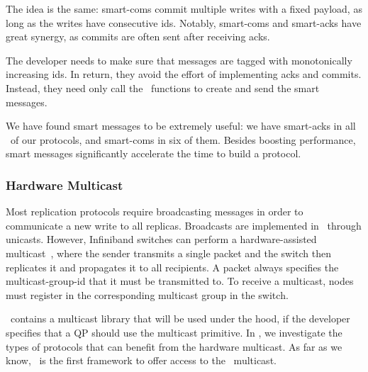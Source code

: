 The idea is the same: smart-coms commit multiple writes with a fixed payload, as long as the writes have consecutive ids. 
Notably, smart-coms and smart-acks have great synergy, as commits are often sent after receiving acks.

The developer needs to make sure that messages are tagged with monotonically increasing ids. In return, they avoid the effort of implementing acks and commits. Instead, they need only call the \odlib~functions to create and send the smart messages.

\custvspace
We have found smart messages to be extremely useful: we have smart-acks in all \pnum~of our protocols, and smart-coms in six of them. 
Besides boosting performance, smart messages significantly accelerate the time to build a protocol.




\subsubsection{Hardware Multicast} \label{sec:nw:mcast}

Most replication protocols require broadcasting messages in order to communicate a new write to all replicas. 
Broadcasts are implemented in \odlib~through unicasts.
However, Infiniband switches can perform a hardware-assisted multicast~\cite{Barak:2015}, where the sender 
transmits a single packet and the switch then replicates it and propagates it to all recipients. A packet always specifies the multicast-group-id that it must be transmitted to.
To receive a multicast, nodes must register in the corresponding multicast group in the switch. 

\odlib~contains a multicast library that will be used under the hood, if the developer specifies that a QP should use the multicast primitive. 
In ,  we investigate the types of protocols that can benefit from the hardware multicast.
As far as we know, \odlib\ is the first framework to offer access to the \RDMA\ multicast.


